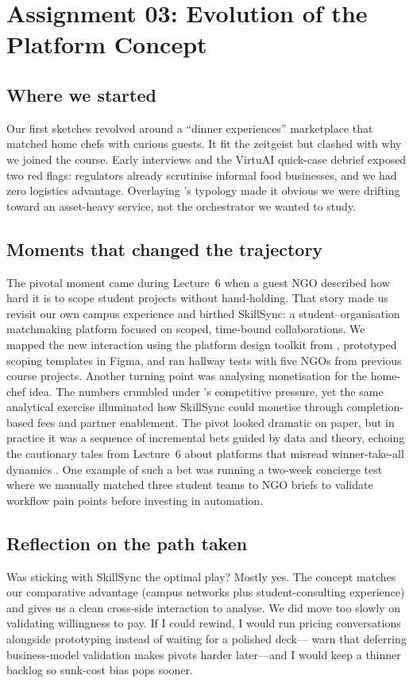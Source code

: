 \section*{Assignment 03: Evolution of the Platform Concept}

\subsection*{Where we started}
Our first sketches revolved around a ``dinner experiences'' marketplace that matched home chefs with curious guests. It fit the zeitgeist but clashed with why we joined the course. Early interviews and the VirtuAI quick-case debrief \citep{Gunasilan2024} exposed two red flags: regulators already scrutinise informal food businesses, and we had zero logistics advantage. Overlaying \citet{Choudary2016}'s typology made it obvious we were drifting toward an asset-heavy service, not the orchestrator we wanted to study.

\subsection*{Moments that changed the trajectory}
The pivotal moment came during Lecture~6 when a guest NGO described how hard it is to scope student projects without hand-holding. That story made us revisit our own campus experience and birthed SkillSync: a student--organisation matchmaking platform focused on scoped, time-bound collaborations. We mapped the new interaction using the platform design toolkit from \citet{Reillier2017}, prototyped scoping templates in Figma, and ran hallway tests with five NGOs from previous course projects. Another turning point was analysing monetisation for the home-chef idea. The numbers crumbled under \citet{Porter2008}'s competitive pressure, yet the same analytical exercise illuminated how SkillSync could monetise through completion-based fees and partner enablement. The pivot looked dramatic on paper, but in practice it was a sequence of incremental bets guided by data and theory, echoing the cautionary tales from Lecture~6 about platforms that misread winner-take-all dynamics \citep{Lecture06}. One example of such a bet was running a two-week concierge test where we manually matched three student teams to NGO briefs to validate workflow pain points before investing in automation.

\subsection*{Reflection on the path taken}
Was sticking with SkillSync the optimal play? Mostly yes. The concept matches our comparative advantage (campus networks plus student-consulting experience) and gives us a clean cross-side interaction to analyse. We did move too slowly on validating willingness to pay. If I could rewind, I would run pricing conversations alongside prototyping instead of waiting for a polished deck---\citet{HagiuWright2013} warn that deferring business-model validation makes pivots harder later---and I would keep a thinner backlog so sunk-cost bias pops sooner.


